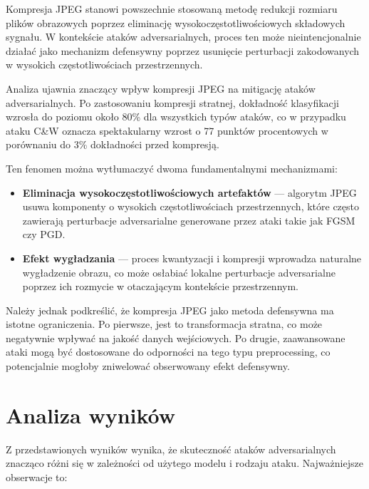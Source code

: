 \documentclass[12pt]{article}
\begin{document}
Kompresja JPEG stanowi powszechnie stosowaną metodę redukcji rozmiaru plików obrazowych poprzez eliminację wysokoczęstotliwościowych składowych sygnału. W kontekście ataków adversarialnych, proces ten może nieintencjonalnie działać jako mechanizm defensywny poprzez usunięcie perturbacji zakodowanych w wysokich częstotliwościach przestrzennych.

Analiza ujawnia znaczący wpływ kompresji JPEG na mitigację ataków adversarialnych. Po zastosowaniu kompresji stratnej, dokładność klasyfikacji wzrosła do poziomu około 80\% dla wszystkich typów ataków, co w przypadku ataku C\&W oznacza spektakularny wzrost o 77 punktów procentowych w porównaniu do 3\% dokładności przed kompresją.

Ten fenomen można wytłumaczyć dwoma fundamentalnymi mechanizmami:

\begin{itemize}
    \item \textbf{Eliminacja wysokoczęstotliwościowych artefaktów} --- algorytm JPEG usuwa komponenty o wysokich częstotliwościach przestrzennych, które często zawierają perturbacje adversarialne generowane przez ataki takie jak FGSM czy PGD.
    
    \item \textbf{Efekt wygładzania} --- proces kwantyzacji i kompresji wprowadza naturalne wygładzenie obrazu, co może osłabiać lokalne perturbacje adversarialne poprzez ich rozmycie w otaczającym kontekście przestrzennym.
\end{itemize}

Należy jednak podkreślić, że kompresja JPEG jako metoda defensywna ma istotne ograniczenia. Po pierwsze, jest to transformacja stratna, co może negatywnie wpływać na jakość danych wejściowych. Po drugie, zaawansowane ataki mogą być dostosowane do odporności na tego typu preprocessing, co potencjalnie mogłoby zniwelować obserwowany efekt defensywny.

\section{Analiza wyników}

Z przedstawionych wyników wynika, że skuteczność ataków adversarialnych znacząco różni się w zależności od użytego modelu i rodzaju ataku. Najważniejsze obserwacje to:
\end{document}
